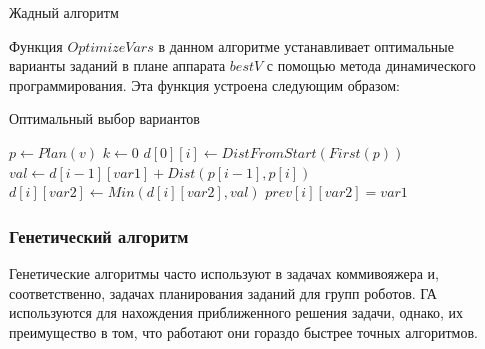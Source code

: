 \documentclass[a4paper,14pt,russian]{article}
\begin{document}
\pagebreak

\begin{algorithm}
\caption{Жадный алгоритм}\label{alg:greedy}
\end{algorithm}

Функция $OptimizeVars$ в данном алгоритме устанавливает оптимальные варианты заданий в плане аппарата $bestV$ с помощью метода динамического программирования. Эта функция устроена следующим образом:

\pagebreak

\begin{algorithm}
\caption{Оптимальный выбор вариантов}\label{alg:dynamic}
\begin{algorithmic}[1]
    \State $p \gets Plan(v)$
    \State $k $
        \State $d[0][i] \gets DistFromStart(First(p))$
    \EndFor
                \State $val \gets d[i - 1][var1] + Dist(p[i - 1], p[i])$
                    \State $d[i][var2] \gets Min(d[i][var2], val)$
                    \State $prev[i][var2] = var1$
                \EndIf
            \EndFor
        \EndFor
    \EndFor
    \State {}
\EndProcedure
\end{algorithmic}
\end{algorithm}


\subsubsection{Генетический алгоритм}
Генетические алгоритмы часто используют в задачах коммивояжера и, соответственно, задачах планирования заданий для групп роботов. ГА используются для нахождения приближенного решения задачи, однако, их преимущество в том, что работают они гораздо быстрее точных алгоритмов.
\end{document}
